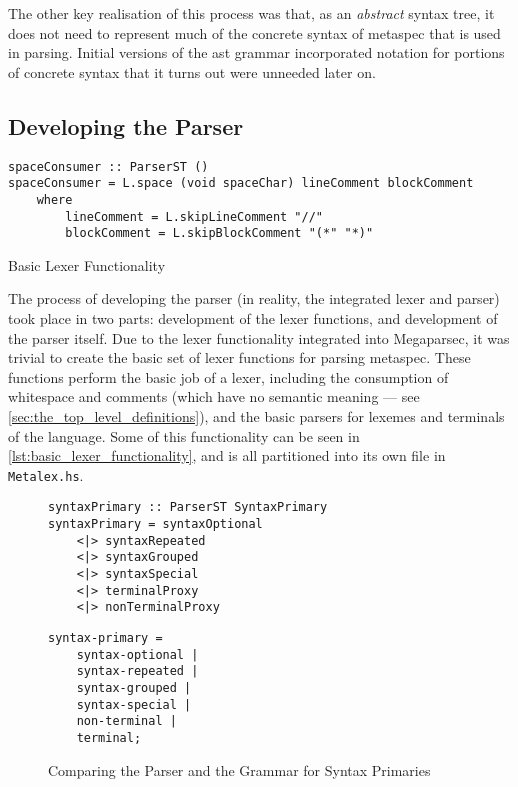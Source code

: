 The other key realisation of this process was that, as an \textit{abstract} syntax tree, it does not need to represent much of the concrete syntax of \gls{metaspec} that is used in parsing. 
Initial versions of the \gls{ast} grammar incorporated notation for portions of concrete syntax that it turns out were unneeded later on. 


\subsection{Developing the Parser} %
\label{sub:developing_the_parser}
\begin{listing}[!htb]
\begin{verbatim}
spaceConsumer :: ParserST ()
spaceConsumer = L.space (void spaceChar) lineComment blockComment
    where
        lineComment = L.skipLineComment "//"
        blockComment = L.skipBlockComment "(*" "*)"
\end{verbatim}
\caption{Basic Lexer Functionality}
\label{lst:basic_lexer_functionality}
\end{listing}

The process of developing the parser (in reality, the integrated lexer and parser) took place in two parts: development of the lexer functions, and development of the parser itself. 
Due to the lexer functionality integrated into Megaparsec, it was trivial to create the basic set of lexer functions for parsing \gls{metaspec}. 
These functions perform the basic job of a lexer, including the consumption of whitespace and comments (which have no semantic meaning --- see \autoref{sec:the_top_level_definitions}), and the basic parsers for lexemes and terminals of the language.
Some of this functionality can be seen in \autoref{lst:basic_lexer_functionality}, and is all partitioned into its own file in \texttt{Metalex.hs}.

\begin{figure}[!htb]
\centering
\begin{minipage}{0.65\textwidth}
\centering
\begin{verbatim}
syntaxPrimary :: ParserST SyntaxPrimary
syntaxPrimary = syntaxOptional
    <|> syntaxRepeated
    <|> syntaxGrouped
    <|> syntaxSpecial
    <|> terminalProxy
    <|> nonTerminalProxy
\end{verbatim}
\end{minipage}
\begin{minipage}{0.34\textwidth}
\centering
\begin{verbatim}
syntax-primary = 
    syntax-optional | 
    syntax-repeated |
    syntax-grouped |
    syntax-special |
    non-terminal |
    terminal;
\end{verbatim}
\end{minipage}
\caption{Comparing the Parser and the Grammar for Syntax Primaries}
\label{lst:comparing_the_parser_and_the_grammar_for_syntax_primaries}
\end{figure}

